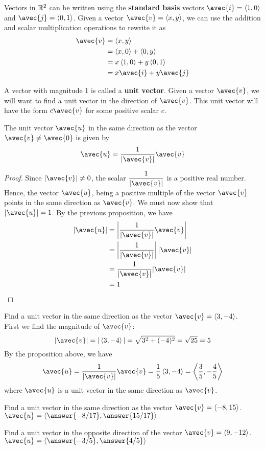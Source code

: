 \documentclass[handout]{ximera}
\begin{document}
Vectors in $\mathbb R^2$ can be written using the {\bf standard basis} vectors $\avec{i} = \vector{1,0}$ and $\avec{j} = \vector{0,1}$.  
Given a vector $\avec{v} = \vector{x,y}$, we can use the addition and scalar multiplication operations to rewrite it as
\begin{align*}
\avec{v} &= \vector{x,y}\\
         &= \vector{x,0} + \vector{0,y}\\
         &= x\vector{1,0} + y \vector{0,1}\\
         &= x\avec{i} + y\avec{j}
\end{align*}

A vector with magnitude 1 is called a {\bf unit vector}. Given a vector $\avec{v}$, we will want to find a unit vector in the direction of $\avec{v}$.
This unit vector will have the form $c\avec{v}$ for some positive scalar $c$.  
\begin{proposition}
The unit vector $\avec{u}$ in the same direction as the vector $\avec{v} \neq \avec{0}$ is given by 
\[
\avec{u} = \frac{1}{|\avec{v}|} \avec{v}
\]
\begin{proof}
Since $|\avec{v}| \neq 0$, the scalar $\displaystyle \frac{1}{|\avec{v}|}$ is a positive real number.  Hence, the vector $\avec{u}$, being a positive multiple of 
the vector $\avec{v}$ points in the same direction as $\avec{v}$. We must now show that $|\avec{u}| = 1$.  By the previous proposition, we have
\begin{align*}
|\avec{u}| &= \left| \frac{1}{|\avec{v}|} \avec{v} \right|\\
           &= \left| \frac{1}{|\avec{v}|} \right| |\avec{v}|\\
           &= \frac{1}{|\avec{v}|} |\avec{v}|\\
           &= 1
\end{align*}
\end{proof}
\end{proposition}

\begin{example}
Find a unit vector in the same direction as the vector $\avec{v} = \vector{3, -4}$.\\
First we find the magnitude of $\avec{v}$:
\[
|\avec{v}| = |\vector{3, -4}| = \sqrt{3^2 + (-4)^2} = \sqrt{25} = 5
\]
By the proposition above, we have
\[
\avec{u} = \frac{1}{|\avec{v}|} \avec{v} = \frac15 \vector{3, -4} = \vector{\frac35, -\frac45}
\]
where $\avec{u}$ is a unit vector in the same direction as $\avec{v}$.
\end{example}

\begin{problem}
Find a unit vector in the same direction as the vector $\avec{v} = \vector{-8, 15}$.\\
$\avec{u} = \vector{\answer{-8/17}, \answer{15/17}}$
\end{problem}

\begin{problem}
Find a unit vector in the opposite direction of the vector $\avec{v} = \vector{9, -12}$.\\
$\avec{u} = \vector{\answer{-3/5}, \answer{4/5}}$
\end{problem}
\end{document}
